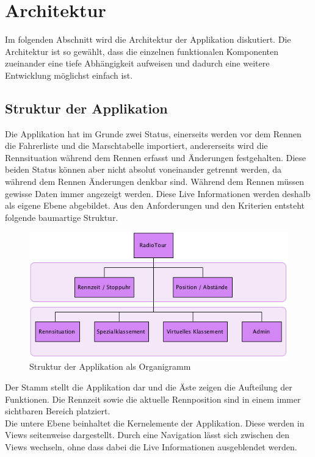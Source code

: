 \chapter{Architektur}
Im folgenden Abschnitt wird die Architektur der Applikation diskutiert. Die Architektur ist so gewählt, dass die einzelnen funktionalen Komponenten zueinander eine tiefe Abhängigkeit aufweisen und dadurch eine weitere Entwicklung möglichst einfach ist.

\section{Struktur der Applikation}
Die Applikation hat im Grunde zwei Status, einerseits werden vor dem Rennen die Fahrerliste und die Marschtabelle importiert, andererseits wird die Rennsituation während dem Rennen erfasst und Änderungen festgehalten. Diese beiden Status können aber nicht absolut voneinander getrennt werden, da während dem Rennen Änderungen denkbar sind. Während dem Rennen müssen gewisse Daten immer angezeigt werden. Diese Live Informationen werden deshalb als eigene Ebene abgebildet. Aus den Anforderungen und den Kriterien entsteht folgende baumartige Struktur.

\begin{figure}[h!]
\caption{Struktur der Applikation als Organigramm}
\centering
\includegraphics[scale=0.9]{05bericht/images/struktur.png}
\end{figure} 

Der Stamm stellt die Applikation dar und die Äste zeigen die Aufteilung der Funktionen. Die Rennzeit sowie die aktuelle Rennposition sind in einem immer sichtbaren Bereich platziert.
\\
Die untere Ebene beinhaltet die Kernelemente der Applikation. Diese werden in Views seitenweise dargestellt. Durch eine Navigation lässt sich zwischen den Views wechseln, ohne dass dabei die Live Informationen ausgeblendet werden.

